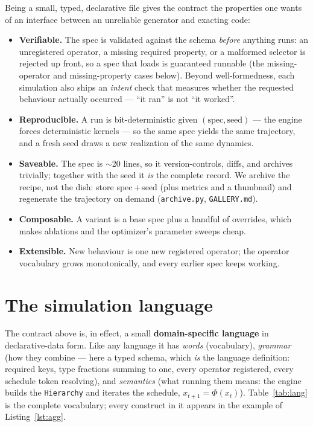 \documentclass[11pt]{article}
\newcommand{\code}[1]{\texttt{#1}}
\begin{document}
Being a small, typed, declarative file gives the contract the properties one wants
of an interface between an unreliable generator and exacting code:
\begin{itemize}\itemsep2pt
\item \textbf{Verifiable.} The spec is validated against the schema \emph{before}
anything runs: an unregistered operator, a missing required property, or a
malformed selector is rejected up front, so a spec that loads is guaranteed
runnable (the missing-operator and missing-property cases below). Beyond
well-formedness, each simulation also ships an \emph{intent} check that measures
whether the requested behaviour actually occurred --- ``it ran'' is not ``it worked''.
\item \textbf{Reproducible.} A run is bit-deterministic given $(\text{spec},
\text{seed})$ --- the engine forces deterministic kernels --- so the same spec
yields the same trajectory, and a fresh seed draws a new realization of the same
dynamics.
\item \textbf{Saveable.} The spec is $\sim$20 lines, so it version-controls, diffs,
and archives trivially; together with the seed it \emph{is} the complete record. We
archive the recipe, not the dish: store spec\,$+$\,seed (plus metrics and a
thumbnail) and regenerate the trajectory on demand (\code{archive.py},
\code{GALLERY.md}).
\item \textbf{Composable.} A variant is a base spec plus a handful of overrides,
which makes ablations and the optimizer's parameter sweeps cheap.
\item \textbf{Extensible.} New behaviour is one new registered operator; the
operator vocabulary grows monotonically, and every earlier spec keeps working.
\end{itemize}

\section{The simulation language}
\label{sec:language}

The contract above is, in effect, a small \textbf{domain-specific language} in
declarative-data form. Like any language it has \emph{words} (vocabulary),
\emph{grammar} (how they combine --- here a typed schema, which \emph{is} the
language definition: required keys, type fractions summing to one, every operator
registered, every schedule token resolving), and \emph{semantics} (what running
them means: the engine builds the \code{Hierarchy} and iterates the schedule,
$x_{t+1}=\Phi(x_t)$). Table~\ref{tab:lang} is the complete vocabulary; every
construct in it appears in the example of Listing~\ref{lst:agg}.
\end{document}
